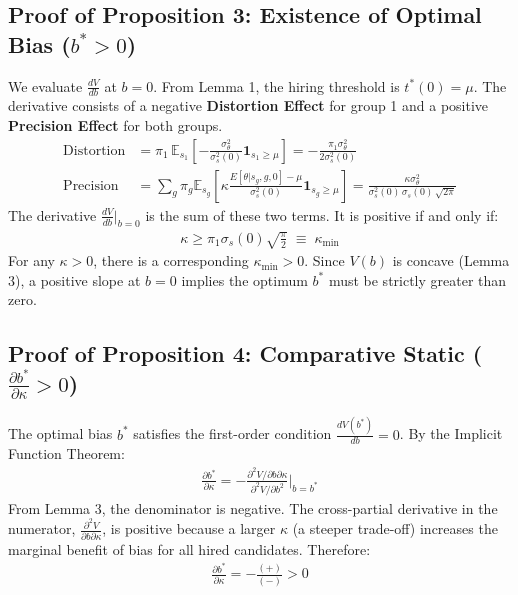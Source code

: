 \subsection{Proof of Proposition 3: Existence of Optimal Bias ($b^* > 0$)}

We evaluate $\frac{dV}{db}$ at $b=0$. From Lemma 1, the hiring threshold is $t^*(0)=\mu$. The derivative consists of a negative \textbf{Distortion Effect} for group 1 and a positive \textbf{Precision Effect} for both groups.
\begin{align}
\text{Distortion} &= \pi_1 \, \mathbb{E}_{s_1}\left[-\frac{\sigma_\theta^2}{\sigma_s^2(0)} \mathbf{1}_{s_1 \ge \mu}\right] = -\frac{\pi_1 \sigma_\theta^2}{2\sigma_s^2(0)} \\
\text{Precision} &= \sum_g \pi_g \mathbb{E}_{s_g}\left[ \kappa \frac{E[\theta|s_g,g,0]-\mu}{\sigma_s^2(0)} \mathbf{1}_{s_g \ge \mu} \right] = \frac{\kappa \sigma_\theta^2}{\sigma_s^2(0)\,\sigma_s(0)\,\sqrt{2\pi}}
\end{align}
The derivative $\frac{dV}{db}\Big|_{b=0}$ is the sum of these two terms. It is positive if and only if:
\begin{align}
\kappa \geq \pi_1 \sigma_s(0) \sqrt{\tfrac{\pi}{2}} \;\equiv\; \kappa_{\min}
\end{align}
For any $\kappa > 0$, there is a corresponding $\kappa_{\min}>0$. Since $V(b)$ is concave (Lemma 3), a positive slope at $b=0$ implies the optimum $b^*$ must be strictly greater than zero.

\subsection{Proof of Proposition 4: Comparative Static ($\frac{\partial b^*}{\partial \kappa} > 0$)}

The optimal bias $b^*$ satisfies the first-order condition $\frac{dV(b^*)}{db} = 0$. By the Implicit Function Theorem:
\begin{align}
\frac{\partial b^*}{\partial \kappa} = -\frac{\partial^2 V / \partial b \partial \kappa}{\partial^2 V / \partial b^2}\bigg|_{b=b^*}
\end{align}
From Lemma 3, the denominator is negative. The cross-partial derivative in the numerator, $\frac{\partial^2 V}{\partial b \partial \kappa}$, is positive because a larger $\kappa$ (a steeper trade-off) increases the marginal benefit of bias for all hired candidates. Therefore:
\begin{align}
\frac{\partial b^*}{\partial \kappa} = -\frac{(+)}{(-)} > 0
\end{align}

